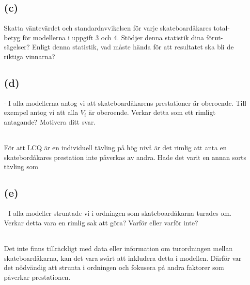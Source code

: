 \documentclass{assignment}
\begin{document}
\subsection*{(c)}

Skatta väntevärdet och standardavvikelsen för varje skateboardåkares total-
betyg för modellerna i uppgift 3 och 4. Stödjer denna statistik dina förut-
sägelser? Enligt denna statistik, vad måste hända för att resultatet ska bli de
riktiga vinnarna?

\subsection*{(d)}

- I alla modellerna antog vi att skateboardåkarens prestationer är oberoende.
Till exempel antog vi att alla $V_i$ är oberoende. Verkar detta som ett rimligt
antagande? Motivera ditt svar.

\\ För att LCQ är en individuell tävling på hög nivå är det rimlig att anta en skatebordåkares
prestation inte påverkas av andra. Hade det varit en annan sorts tävling som 

\subsection*{(e)}


- I alla modeller struntade vi i ordningen som skateboardåkarna turades om.
Verkar detta vara en rimlig sak att göra? Varför eller varför inte?

\\Det inte finns tillräckligt med data eller information om turordningen mellan skateboardåkarna, kan det vara svårt att inkludera detta i modellen. 
Därför var det nödvändig att strunta i ordningen och fokusera på andra faktorer som påverkar prestationen.
\end{document}
